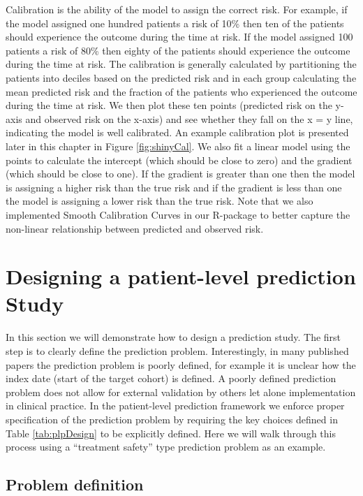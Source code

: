\documentclass[11pt]{book}
\theoremstyle{definition}
\theoremstyle{definition}
\theoremstyle{definition}
\theoremstyle{remark}
\begin{document}
Calibration is the ability of the model to assign the correct risk. For example, if the model assigned one hundred patients a risk of 10\% then ten of the patients should experience the outcome during the time at risk. If the model assigned 100 patients a risk of 80\% then eighty of the patients should experience the outcome during the time at risk. The calibration is generally calculated by partitioning the patients into deciles based on the predicted risk and in each group calculating the mean predicted risk and the fraction of the patients who experienced the outcome during the time at risk. We then plot these ten points (predicted risk on the y-axis and observed risk on the x-axis) and see whether they fall on the x = y line, indicating the model is well calibrated. An example calibration plot is presented later in this chapter in Figure \ref{fig:shinyCal}. We also fit a linear model using the points to calculate the intercept (which should be close to zero) and the gradient (which should be close to one). If the gradient is greater than one then the model is assigning a higher risk than the true risk and if the gradient is less than one the model is assigning a lower risk than the true risk. Note that we also implemented Smooth Calibration Curves in our R-package to better capture the non-linear relationship between predicted and observed risk. 

\hypertarget{designing-a-patient-level-prediction-study}{%
\section{Designing a patient-level prediction Study}\label{designing-a-patient-level-prediction-study}}

In this section we will demonstrate how to design a prediction study. The first step is to clearly define the prediction problem. Interestingly, in many published papers the prediction problem is poorly defined, for example it is unclear how the index date (start of the target cohort) is defined. A poorly defined prediction problem does not allow for external validation by others let alone implementation in clinical practice. In the patient-level prediction framework we enforce proper specification of the prediction problem by requiring the key choices defined in Table \ref{tab:plpDesign} to be explicitly defined. Here we will walk through this process using a ``treatment safety'' type prediction problem as an example. 

\hypertarget{problem-definition-2}{%
\subsection{Problem definition}\label{problem-definition-2}}
\end{document}
